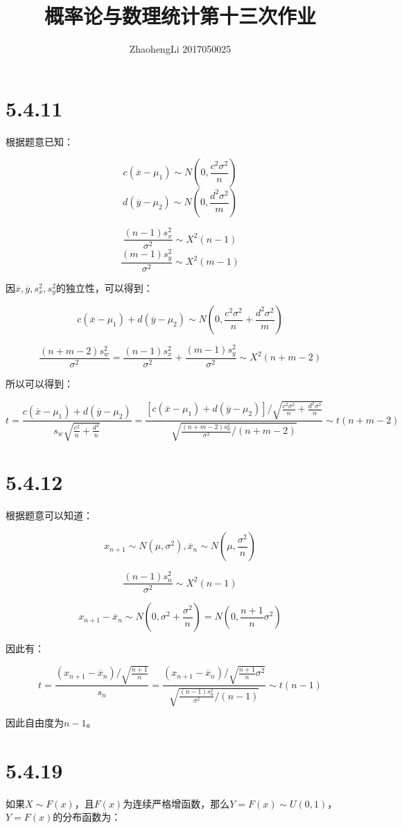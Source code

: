\documentclass{article}
\title{概率论与数理统计第十三次作业}
\author{ZhaohengLi 2017050025}
\begin{document}
\maketitle

\section{5.4.11}
根据题意已知：

$$c(\overline x-\mu_1)\sim N(0,\frac{c^2\sigma^2}{n})$$
$$d(\overline y-\mu_2)\sim N(0,\frac{d^2\sigma^2}{m})$$

$$\frac{(n-1)s_x^2}{\sigma^2}\sim X^2(n-1)$$
$$\frac{(m-1)s_y^2}{\sigma^2}\sim X^2(m-1)$$

因$\overline x,\overline y,s_x^2,s_y^2$的独立性，可以得到：

$$c(\overline x-\mu_1)+d(\overline y-\mu_2)\sim N(0,\frac{c^2\sigma^2}{n}+\frac{d^2\sigma^2}{m})$$

$$\frac{(n+m-2)s_w^2}{\sigma^2}=\frac{(n-1)s_x^2}{\sigma^2}+\frac{(m-1)s_y^2}{\sigma^2}\sim X^2(n+m-2)$$

所以可以得到：

$$t=\frac{c(\overline x-\mu_1)+d(\overline y-\mu_2)}{s_w\sqrt{\frac{c^2}{n}+\frac{d^2}{n}}}=\frac{[c(\overline x-\mu_1)+d(\overline y-\mu_2)]/\sqrt{\frac{c^2\sigma^2}{n}+\frac{d^2\sigma^2}{n}}}{\sqrt{\frac{(n+m-2)s_w^2}{\sigma^2}/(n+m-2)}}\sim t(n+m-2)$$

\section{5.4.12}
根据题意可以知道：

$$x_{n+1}\sim N(\mu,\sigma^2),\overline{x}_n\sim N(\mu,\frac{\sigma^2}{n})$$

$$\frac{(n-1)s_n^2}{\sigma^2}\sim X^2(n-1)$$

$$x_{n+1}-\overline x_n\sim N(0,\sigma^2+\frac{\sigma^2}{n})=N(0,\frac{n+1}n\sigma^2)$$

因此有：

$$t=\frac{(x_{n+1}-\overline x_n)/\sqrt{\frac{n+1}n}}{s_n}=\frac{(x_{n+1}-\overline x_n)/\sqrt{\frac{n+1}n\sigma^2}}{\sqrt{\frac{(n-1)s_n^2}{\sigma^2}/(n-1)}}\sim t(n-1)$$

因此自由度为$n-1$。

\section{5.4.19}

如果$X\sim F(x)$，且$F(x)$为连续严格增函数，那么$Y=F(x)\sim U(0,1)$，$Y=F(x)$的分布函数为：
\end{document}
